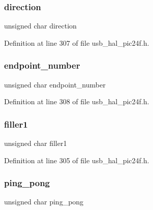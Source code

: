 \mbox{\label{union_____u_s_t_a_t_a4c9b82152ef06a9d3b78f60779cd4b85}} 
\subsubsection{\texorpdfstring{direction}{direction}}
{\footnotesize\ttfamily unsigned char direction}



Definition at line 307 of file usb\+\_\+hal\+\_\+pic24f.\+h.

\mbox{\label{union_____u_s_t_a_t_a4f411fec039d172f03e2a41d46ff58ca}} 
\subsubsection{\texorpdfstring{endpoint\_number}{endpoint\_number}}
{\footnotesize\ttfamily unsigned char endpoint\+\_\+number}



Definition at line 308 of file usb\+\_\+hal\+\_\+pic24f.\+h.

\mbox{\label{union_____u_s_t_a_t_a54acb45d462e0ff47705a7514916273d}} 
\subsubsection{\texorpdfstring{filler1}{filler1}}
{\footnotesize\ttfamily unsigned char filler1}



Definition at line 305 of file usb\+\_\+hal\+\_\+pic24f.\+h.

\mbox{\label{union_____u_s_t_a_t_a9ec468b66f0444dc9be4ec11f75a0a5f}} 
\subsubsection{\texorpdfstring{ping\_pong}{ping\_pong}}
{\footnotesize\ttfamily unsigned char ping\+\_\+pong}




